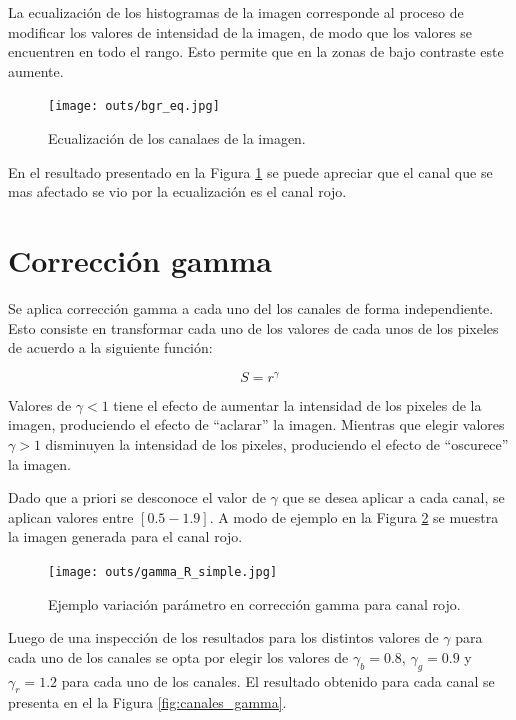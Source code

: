 \documentclass[letterpaper,9pt,journal,final]{IEEEtran}
\begin{document}
La ecualización de los histogramas de la imagen corresponde al proceso
de modificar los valores de intensidad de la imagen, de modo que los
valores se encuentren en todo el rango. Esto permite que en la zonas de
bajo contraste este aumente.

\begin{figure}[h!]
\hypertarget{fig:canales_eq}{%
\centering
\texttt{[image: outs/bgr\_eq.jpg]}
\caption{Ecualización de los canalaes de la
imagen.}\label{fig:canales_eq}
}
\end{figure}

En el resultado presentado en la Figura \ref{fig:canales_eq} se puede apreciar
que el canal que se mas afectado se vio por la ecualización es el canal
rojo.

\hypertarget{correciuxf3n-gamma}{%
\section{Corrección gamma}\label{correciuxf3n-gamma}}

Se aplica corrección gamma a cada uno del los canales de forma
independiente. Esto consiste en transformar cada uno de los valores de
cada unos de los pixeles de acuerdo a la siguiente función:

\[S = r^{\gamma}\]

Valores de \(\gamma < 1\) tiene el efecto de aumentar la intensidad de
los pixeles de la imagen, produciendo el efecto de ``aclarar'' la
imagen. Mientras que elegir valores \(\gamma > 1\) disminuyen la
intensidad de los pixeles, produciendo el efecto de ``oscurece'' la
imagen.

Dado que a priori se desconoce el valor de \(\gamma\) que se desea
aplicar a cada canal, se aplican valores entre \([0{.}5 - 1{.}9]\). A
modo de ejemplo en la Figura \ref{fig:gamma_red} se muestra la imagen
generada para el canal rojo.

\begin{figure}[h!]
\hypertarget{fig:gamma_red}{%
\centering
\texttt{[image: outs/gamma\_R\_simple.jpg]}
\caption{Ejemplo variación parámetro en corrección gamma para canal
rojo.}\label{fig:gamma_red}
}
\end{figure}

Luego de una inspección de los resultados para los distintos valores de
\(\gamma\) para cada uno de los canales se opta por elegir los valores
de \(\gamma_b=0{.}8\), \(\gamma_g=0{.}9\) y \(\gamma_r=1{.}2\) para cada
uno de los canales. El resultado obtenido para cada canal se presenta en
el la Figura \ref{fig:canales_gamma}.
\end{document}
